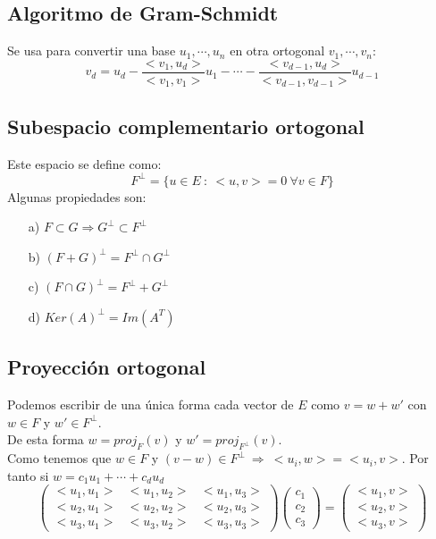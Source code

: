 \documentclass[12pt]{article}
\begin{document}
	\subsection{Algoritmo de Gram-Schmidt}
	Se usa para convertir una base ${u_1, \cdots , u_n}$ en otra ortogonal ${v_1, \cdots , v_n}$:
	\[v_d=u_d - \frac{<v_1, u_d>}{<v_1, v_1>}u_1 - \cdots - \frac{<v_{d-1}, u_d>}{<v_{d-1}, v_{d-1}>}u_{d-1}\]
	
	\subsection{Subespacio complementario ortogonal}
	Este espacio se define como:
	\[F^{\perp} = \{ u\in E \ : \ <u, v>=0 \ \forall v \in F \} \]
	Algunas propiedades son:
	\begin{itemize}
		\item[a)] $F \subset G \Rightarrow G^{\perp} \subset F^{\perp}$
		\item[b)] $(F+G)^{\perp} = F^{\perp}\cap G^{\perp}$
		\item[c)] $(F \cap G)^{\perp} = F^{\perp} + G^{\perp}$
		\item[d)] $Ker(A)^{\perp} = Im(A^T)$
	\end{itemize}
	
	\subsection{Proyección ortogonal}
	Podemos escribir de una única forma cada vector de $E$ como $v=w+w'$ con $w\in F$ y  $w' \in F^{\perp}$.\\
	De esta forma $w= proj_F(v)$ y $w'=proj_{F^{\perp}}(v)$. \\
	Como tenemos que $w\in F$ y $(v-w) \in F^{\perp} \ \Rightarrow \ <u_i, w>= <u_i,v>$. Por tanto si $w=c_1u_1+\cdots + c_du_d$
	\[\begin{pmatrix} 
	<u_1, u_1> & <u_1, u_2> & <u_1, u_3> \\
    <u_2, u_1> & <u_2, u_2> & <u_2, u_3> \\
    <u_3, u_1> & <u_3, u_2> & <u_3, u_3> 
    \end{pmatrix}
    \begin{pmatrix} 
	c_1 \\
	c_2 \\
	c_3
	\end{pmatrix}
	= 
	\begin{pmatrix} 
	<u_1,v> \\
	<u_2,v> \\
	<u_3,v>
	\end{pmatrix}
    \]
	
\end{document}
